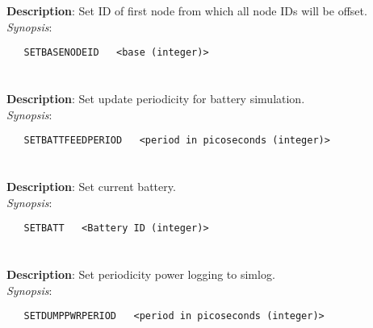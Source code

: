 \section{\quad{}}
\label{manpages:SETBASENODEID}
\label{manpages:setbasenodeid}
\vspace{-0.1in}
{\bf Description}: 	Set ID of first node from which all node IDs will be offset.\\[1.5ex]
{\em Synopsis}:
\vspace{-0.05in}
\scriptsize
\begin{lstlisting}
   SETBASENODEID   <base (integer)>																
\end{lstlisting}
\normalsize
\vspace{-0.05in}


\section{\quad{}}
\label{manpages:SETBATTFEEDPERIOD}
\label{manpages:setbattfeedperiod}
\vspace{-0.1in}
{\bf Description}: 	Set update periodicity for battery simulation.\\[1.5ex]
{\em Synopsis}:
\vspace{-0.05in}
\scriptsize
\begin{lstlisting}
   SETBATTFEEDPERIOD   <period in picoseconds (integer)>															
\end{lstlisting}
\normalsize
\vspace{-0.05in}


\section{\quad{}}
\label{manpages:SETBATT}
\label{manpages:setbatt}
\vspace{-0.1in}
{\bf Description}: 	Set current battery.\\[1.5ex]
{\em Synopsis}:
\vspace{-0.05in}
\scriptsize
\begin{lstlisting}
   SETBATT   <Battery ID (integer)>																				
\end{lstlisting}
\normalsize
\vspace{-0.05in}


\section{\quad{}}
\label{manpages:SETDUMPPWRPERIOD}
\label{manpages:setdumppwrperiod}
\vspace{-0.1in}
{\bf Description}: 	Set periodicity power logging to simlog.\\[1.5ex]
{\em Synopsis}:
\vspace{-0.05in}
\scriptsize
\begin{lstlisting}
   SETDUMPPWRPERIOD   <period in picoseconds (integer)>																
\end{lstlisting}
\normalsize
\vspace{-0.05in}


